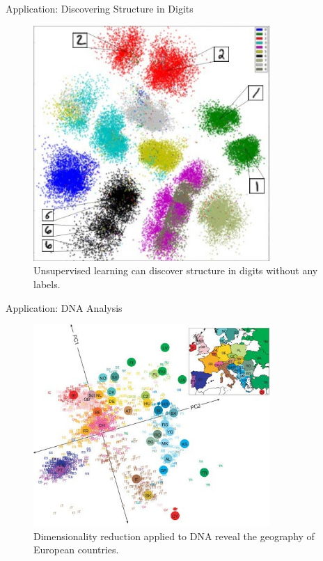\begin{frame}{Application: Discovering Structure in Digits}
    \begin{figure}
    \centering
    \includegraphics[width=0.8\textwidth,height=0.75\textheight,keepaspectratio]{images/dul/discover-structure.jpg}
    \caption*{Unsupervised learning can discover structure in digits without any labels.}
    \end{figure}
\end{frame}

\begin{frame}{Application: DNA Analysis}
    \begin{figure}
    \centering
    \includegraphics[width=0.8\textwidth,height=0.75\textheight,keepaspectratio]{images/dul/dim-reduce.jpg}
    \caption*{Dimensionality reduction applied to DNA reveal the geography of European countries.}
    \end{figure}
\end{frame}

